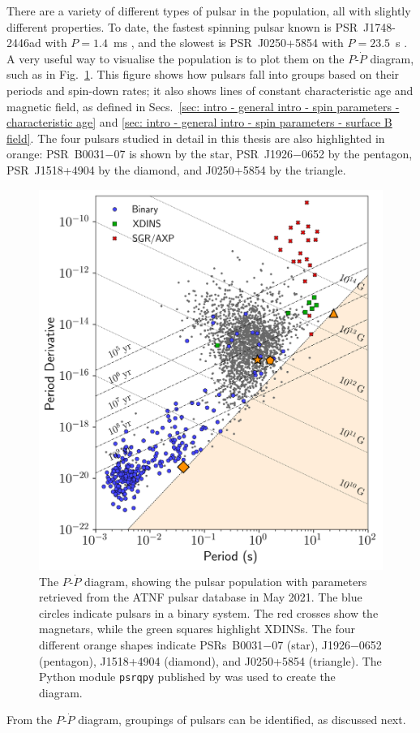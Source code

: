 There are a variety of different types of pulsar in the population, all with slightly different properties. To date, the fastest spinning pulsar known is PSR~J1748-2446ad with $P=1.4$~ms \citep{HRS+2006}, and the slowest is PSR~J0250+5854 with $P=23.5$~s \citep[][see Chapter~\ref{chapt: J0250}]{TBC+2018}. A very useful way to visualise the population is to plot them on the $P$-$\dot{P}$ diagram, such as in Fig.~\ref{fig: intro - ppdot diagram}. This figure shows how pulsars fall into groups based on their periods and spin-down rates; it also shows lines of constant characteristic age and magnetic field, as defined in Secs.~\ref{sec: intro - general intro - spin parameters - characteristic age} and \ref{sec: intro - general intro - spin parameters - surface B field}. The four pulsars studied in detail in this thesis are also highlighted in orange: PSR~B0031$-$07 is shown by the star, PSR~J1926$-$0652 by the pentagon, PSR~J1518+4904 by the diamond, and J0250+5854 by the triangle.
\begin{figure}
    \begin{center}
        \includegraphics[width=1.0\textwidth]{Figures/Introduction/ppdot_diagram}
        \caption[The period/period derivative diagram]{The $P$-$\dot{P}$ diagram, showing the pulsar population with parameters retrieved from the ATNF pulsar database \citep{ATNFcatalogue} in May 2021. The blue circles indicate pulsars in a binary system. The red crosses show the magnetars, while the green squares highlight XDINSs. The four different orange shapes indicate PSRs~B0031$-$07 (star), J1926$-$0652 (pentagon), J1518+4904 (diamond), and J0250+5854 (triangle). The Python module \texttt{psrqpy} published by \citet{Pxxx2018} was used to create the diagram.}
        \label{fig: intro - ppdot diagram}
    \end{center}
\end{figure}
From the $P$-$\dot{P}$ diagram, groupings of pulsars can be identified, as discussed next.


